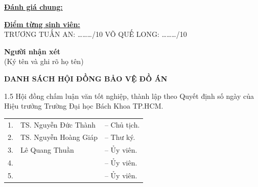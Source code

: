 \documentclass[12pt,a4paper]{article}
\begin{document}
\vspace{0.2cm}

\noindent \underline{\textbf{Đánh giá chung:}} \dotfill \\
\dotfill

\vspace{0.3cm}

\noindent \underline{\textbf{Điểm từng sinh viên:}} \\[0.1cm]
\small TRƯƠNG TUẤN AN: \dots\dots\dots/10 \hfill VÕ QUẾ LONG: \dots\dots\dots/10 \hspace{2cm}

\vspace{0.3cm}

\hfill
\begin{minipage}[t]{0.45\textwidth}
    \centering
    \textbf{Người nhận xét} \\
    \vspace{0.1cm}
    (Ký tên và ghi rõ họ tên)
\end{minipage}

\newpage

\vspace*{1.5cm}

\begin{center}
    {\large \textbf{DANH SÁCH HỘI ĐỒNG BẢO VỆ ĐỒ ÁN}}
\end{center}

\vspace{0.5cm}

\noindent
\begin{spacing}{1.5}
Hội đồng chấm luận văn tốt nghiệp, thành lập theo Quyết định số \dotfill ngày \dotfill của Hiệu trưởng Trường Đại học Bách Khoa TP.HCM.
\end{spacing}

\vspace{1.0cm}

\begin{center}
    \begin{tabular}{@{}p{} p{} p{}@{}}
        1. & TS. Nguyễn Đức Thành \dotfill & -- Chủ tịch. \\[0.4cm]
        2. & TS. Nguyễn Hoàng Giáp \dotfill & -- Thư ký. \\[0.4cm]
        3. & Lê Quang Thuần \dotfill & -- Ủy viên. \\[0.4cm]
        4. & \dotfill & -- Ủy viên. \\[0.4cm]
        5. & \dotfill & -- Ủy viên.
    \end{tabular}
\end{center}
\end{document}
